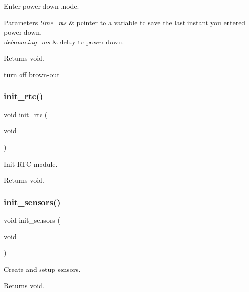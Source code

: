 Enter power down mode. 


\begin{DoxyParams}{Parameters}
{\em time\+\_\+ms} & pointer to a variable to save the last instant you entered power down. \\
\hline
{\em debouncing\+\_\+ms} & delay to power down. \\
\hline
\end{DoxyParams}
\begin{DoxyReturn}{Returns}
void. 
\end{DoxyReturn}
turn off brown-\/out \mbox{\label{i2c-th_8h_a88533ad02465ce52d4e6de7b2095ec32}} 
\subsubsection{\texorpdfstring{init\+\_\+rtc()}{init\_rtc()}}
{\footnotesize\ttfamily void init\+\_\+rtc (\begin{DoxyParamCaption}\item[{void}]{ }\end{DoxyParamCaption})}



Init R\+TC module. 

\begin{DoxyReturn}{Returns}
void. 
\end{DoxyReturn}
\mbox{\label{i2c-th_8h_ad7577ba7f06f417a019b69da8682ede5}} 
\subsubsection{\texorpdfstring{init\+\_\+sensors()}{init\_sensors()}}
{\footnotesize\ttfamily void init\+\_\+sensors (\begin{DoxyParamCaption}\item[{void}]{ }\end{DoxyParamCaption})}



Create and setup sensors. 

\begin{DoxyReturn}{Returns}
void. 
\end{DoxyReturn}
\mbox{\label{i2c-th_8h_a4454f968b2402a0e61deb15ab2571dab}} 
